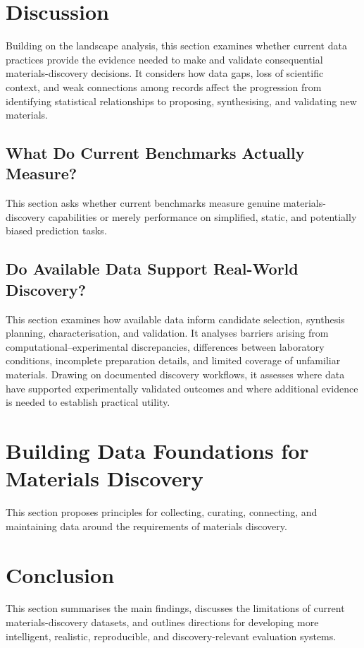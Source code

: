 \documentclass[11pt,a4paper]{article}
\begin{document}
\section{Discussion}
Building on the landscape analysis, this section examines whether current
data practices provide the evidence needed to make and validate
consequential materials-discovery decisions. It considers how data gaps,
loss of scientific context, and weak connections among records affect the
progression from identifying statistical relationships to proposing,
synthesising, and validating new materials.

\subsection{What Do Current Benchmarks Actually Measure?}
This section asks whether current benchmarks measure genuine
materials-discovery capabilities or merely performance on simplified,
static, and potentially biased prediction tasks.

\subsection{Do Available Data Support Real-World Discovery?}
This section examines how available data inform candidate selection,
synthesis planning, characterisation, and validation. It analyses barriers
arising from computational--experimental discrepancies, differences between
laboratory conditions, incomplete preparation details, and limited coverage
of unfamiliar materials. Drawing on documented discovery workflows, it
assesses where data have supported experimentally validated outcomes and
where additional evidence is needed to establish practical utility.

\section{Building Data Foundations for Materials Discovery}
This section proposes principles for collecting, curating, connecting, and
maintaining data around the requirements of materials discovery.

\section{Conclusion}
This section summarises the main findings, discusses the limitations of
current materials-discovery datasets, and outlines directions for
developing more intelligent, realistic, reproducible, and
discovery-relevant evaluation systems.
\end{document}
